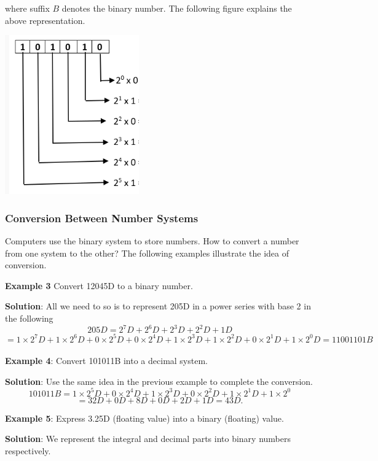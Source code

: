 \documentclass[
]{book}
\begin{document}
where suffix \(B\) denotes the binary number. The following figure explains the above representation.

\begin{center}\includegraphics[width=0.35\linewidth]{img02/w02-base2Rep} \end{center}

\hfill\break

\hypertarget{conversion-between-number-systems}{%
\subsubsection{Conversion Between Number Systems}\label{conversion-between-number-systems}}

Computers use the binary system to store numbers. How to convert a number from one system to the other? The following examples illustrate the idea of conversion.

\textbf{Example 3} Convert 12045D to a binary number.

\textbf{Solution}: All we need to so is to represent 205D in a power series with base 2 in the following \[
205D = 2^7D + 2^6D + 2^3D + 2^2D + 1D  
\] \[
= 1 \times 2^7D + 1\times 2^6D +0\times 2^5D + 0\times 2^4D + 1\times 2^3D + 1\times 2^2D + 0\times 2^1D + 1\times 2^0D = 11001101B
\]\\

\textbf{Example 4}: Convert 101011B into a decimal system.

\textbf{Solution}: Use the same idea in the previous example to complete the conversion. \[
101011B = 1\times 2^5D + 0\times 2^4D + 1\times 2^3D + 0\times 2^2D + 1\times 2^1D + 1\times 2^0 
\] \[
=32D + 0D + 8D + 0D + 2D + 1D = 43D.
\]

\hfill\break

\textbf{Example 5}: Express 3.25D (floating value) into a binary (floating) value.

\textbf{Solution}: We represent the integral and decimal parts into binary numbers respectively.
\end{document}
